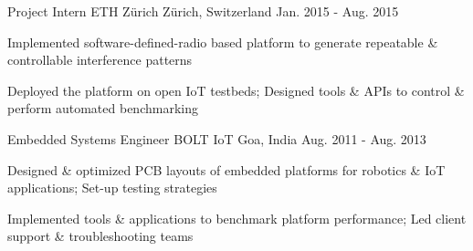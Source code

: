 \begin{cventries}
  \cventry
    {Project Intern} %
    {ETH Zürich} %
    {Zürich, Switzerland} %
    {Jan. 2015 - Aug. 2015} %
    {
      \begin{cvitems} %
      	\item {Implemented software-defined-radio based platform to generate repeatable \& controllable interference patterns}
        \item {Deployed the platform on open IoT testbeds; Designed tools \& APIs to control \& perform automated benchmarking}
      \end{cvitems}
    }

  \cventry
    {Embedded Systems Engineer} %
    {BOLT IoT} %
    {Goa, India} %
    {Aug. 2011 - Aug. 2013} %
    {
      \begin{cvitems} %
      	\item {Designed \& optimized PCB layouts of embedded platforms for robotics \& IoT applications; Set-up testing strategies}
        \item {Implemented tools \& applications to benchmark platform performance; Led client support \& troubleshooting teams}
      \end{cvitems}
    }

\end{cventries}
